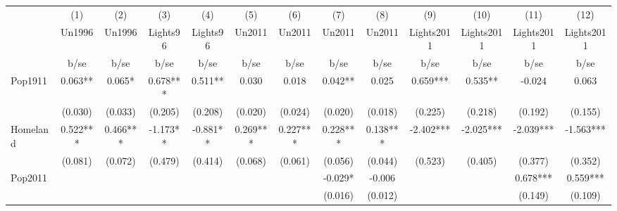 {
\def\sym#1{\ifmmode^{#1}\else\(^{#1}\)\fi}
\begin{tabular}{l*{12}{c}}
\hline\hline
                    &\multicolumn{1}{c}{(1)}&\multicolumn{1}{c}{(2)}&\multicolumn{1}{c}{(3)}&\multicolumn{1}{c}{(4)}&\multicolumn{1}{c}{(5)}&\multicolumn{1}{c}{(6)}&\multicolumn{1}{c}{(7)}&\multicolumn{1}{c}{(8)}&\multicolumn{1}{c}{(9)}&\multicolumn{1}{c}{(10)}&\multicolumn{1}{c}{(11)}&\multicolumn{1}{c}{(12)}\\
                    &\multicolumn{1}{c}{Un1996}&\multicolumn{1}{c}{Un1996}&\multicolumn{1}{c}{Lights96}&\multicolumn{1}{c}{Lights96}&\multicolumn{1}{c}{Un2011}&\multicolumn{1}{c}{Un2011}&\multicolumn{1}{c}{Un2011}&\multicolumn{1}{c}{Un2011}&\multicolumn{1}{c}{Lights2011}&\multicolumn{1}{c}{Lights2011}&\multicolumn{1}{c}{Lights2011}&\multicolumn{1}{c}{Lights2011}\\
                    &        b/se   &        b/se   &        b/se   &        b/se   &        b/se   &        b/se   &        b/se   &        b/se   &        b/se   &        b/se   &        b/se   &        b/se   \\
\hline
Pop1911             &       0.063** &       0.065*  &       0.678***&       0.511** &       0.030   &       0.018   &       0.042** &       0.025   &       0.659***&       0.535** &      -0.024   &       0.063   \\
                    &     (0.030)   &     (0.033)   &     (0.205)   &     (0.208)   &     (0.020)   &     (0.024)   &     (0.020)   &     (0.018)   &     (0.225)   &     (0.218)   &     (0.192)   &     (0.155)   \\
Homeland            &       0.522***&       0.466***&      -1.173** &      -0.881** &       0.269***&       0.227***&       0.228***&       0.138***&      -2.402***&      -2.025***&      -2.039***&      -1.563***\\
                    &     (0.081)   &     (0.072)   &     (0.479)   &     (0.414)   &     (0.068)   &     (0.061)   &     (0.056)   &     (0.044)   &     (0.523)   &     (0.405)   &     (0.377)   &     (0.352)   \\
Pop2011             &               &               &               &               &               &               &      -0.029*  &      -0.006   &               &               &       0.678***&       0.559***\\
                    &               &               &               &               &               &               &     (0.016)   &     (0.012)   &               &               &     (0.149)   &     (0.109)   \\

\end{tabular}}
